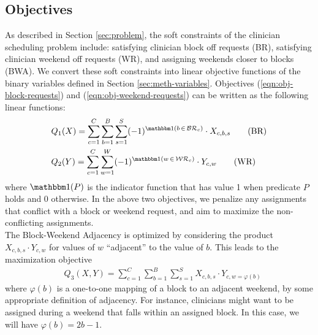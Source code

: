 \subsection{Objectives} \label{sec:meth-objectives}
As described in Section \ref{sec:problem}, the soft constraints of the clinician scheduling problem include: satisfying clinician block off requests (BR), satisfying clinician weekend off requests (WR), and assigning weekends closer to blocks (BWA). We convert these soft constraints into linear objective functions of the binary variables defined in Section \ref{sec:meth-variables}. Objectives (\ref{eqn:obj-block-requests}) and (\ref{eqn:obj-weekend-requests}) can be written as the following linear functions:  %
\begin{align}
	&Q_1(X) = \sum_{c=1}^{C} \sum_{b=1}^{B} \sum_{s=1}^{S} (-1)^{\ind(b\,\in\,\mathcal{BR}_c)}\cdot X_{c, b, s} \tag{BR} \label{eqn:obj-block-requests}\\
	&Q_2(Y) = \sum_{c=1}^{C} \sum_{w=1}^{W} (-1)^{\ind(w\,\in\,\mathcal{WR}_c)}\cdot Y_{c, w} \tag{WR} \label{eqn:obj-weekend-requests}
\end{align}
where $\ind(P)$ is the indicator function that has value 1 when predicate $P$ holds and 0 otherwise. In the above two objectives, we penalize any assignments that conflict with a block or weekend request, and aim to maximize the non-conflicting assignments. \\

The Block-Weekend Adjacency is optimized by considering the product $X_{c, b, s}\cdot Y_{c, w}$ for values of $w$ ``adjacent'' to the value of $b$. This leads to the maximization objective %
\begin{align}
&Q_3(X, Y) = \sum_{c=1}^{C} \sum_{b=1}^{B} \sum_{s=1}^{S} X_{c, b, s}\cdot Y_{c, w=\varphi(b)} \tag{BWA} \label{eqn:obj-block-weekend-adj}
\end{align}
where $\varphi(b)$ is a one-to-one mapping of a block to an adjacent weekend, by some appropriate definition of adjacency. For instance, clinicians might want to be assigned during a weekend that falls within an assigned block. In this case, we will have $\varphi(b) = 2b-1$. \\


